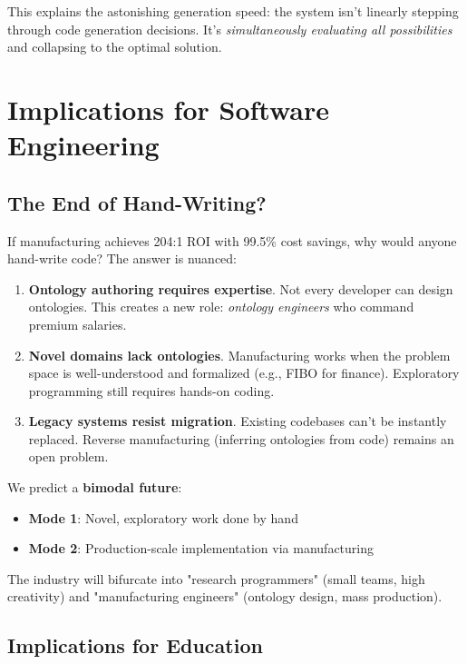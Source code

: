 This explains the astonishing generation speed: the system isn't linearly stepping through code generation decisions. It's \textit{simultaneously evaluating all possibilities} and collapsing to the optimal solution.

\section{Implications for Software Engineering}

\subsection{The End of Hand-Writing?}

If manufacturing achieves 204:1 ROI with 99.5\% cost savings, why would anyone hand-write code? The answer is nuanced:

\begin{enumerate}
    \item \textbf{Ontology authoring requires expertise}. Not every developer can design ontologies. This creates a new role: \textit{ontology engineers} who command premium salaries.

    \item \textbf{Novel domains lack ontologies}. Manufacturing works when the problem space is well-understood and formalized (e.g., FIBO for finance). Exploratory programming still requires hands-on coding.

    \item \textbf{Legacy systems resist migration}. Existing codebases can't be instantly replaced. Reverse manufacturing (inferring ontologies from code) remains an open problem.
\end{enumerate}

We predict a \textbf{bimodal future}:
\begin{itemize}
    \item \textbf{Mode 1}: Novel, exploratory work done by hand
    \item \textbf{Mode 2}: Production-scale implementation via manufacturing
\end{itemize}

The industry will bifurcate into "research programmers" (small teams, high creativity) and "manufacturing engineers" (ontology design, mass production).

\subsection{Implications for Education}

